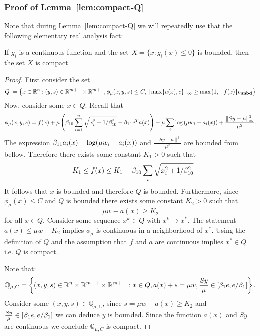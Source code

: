 \documentclass{article}
\begin{document}
\subsubsection{Proof of Lemma~\ref{lem:compact-Q}} \label{sec:lem:compact-Q}

Note that during Lemma~\ref{lem:compact-Q} we will repeatedly use that the following elementary real analysis fact: 

\begin{fact}
If $g_i$ is a continuous function and the set $X = \{ x : g_i(x) \le 0 \}$ is bounded, then the set $X$ is compact
\end{fact}

\lemCompactQ*

\begin{proof}
First consider the set
$$
Q := \left\{ x \in \mathbb{R}^{n} : (y, s) \in \mathbb{R}^{m++} \times \mathbb{R}^{m++}, \phi_{\mu}(x,y,s) \le C, \| \max\{ a(x), e \} \|_{\infty} \ge \max\{1,-f(x) \} \epsilon_{\textbf{unbd}} \right\} 
$$
Now, consider some $x \in Q$. Recall that
$$
\phi_{\mu}(x, y, s) = f(x) + \mu \left( \beta_{10} \sum_{i = 1}^{n} \sqrt{x_i^2 + 1 / \beta_{10}^2} - \beta_{11} e^T a(x) \right)  - \mu  \sum_i{ \log \left( \mu w_i - a_i(x)  \right) } + \frac{\| S y - \mu \|_{\infty}^3}{\mu^2}.
$$
The expression $\beta_{11} a_i(x) - \log(\mu w_i - a_i(x))$ and $\frac{\| S y - \mu \|^3}{\mu^2}$ are bounded from bellow. Therefore there exists some constant $K_{1} > 0$ such that
$$
-K_{1} \le f(x) \le K_{1} - \beta_{10} \sum_{i}{\sqrt{x_i^2 + 1 / \beta_{10}^2}}
$$
It follows that $x$ is bounded and therefore $Q$ is bounded. Furthermore, since $\phi_{\mu}(x) \le C$ and $Q$ is bounded there exists some constant $K_{2} > 0$ such that
$$
\mu w - a(x) \ge K_{2}
$$
for all $x \in Q$. Consider some sequence $x^{k} \in Q$ with $x^{k} \rightarrow x^{*}$. The statement $a(x) \le \mu w - K_{2}$ implies $\phi_{\mu}$ is continuous in a neighborhood of $x^{*}$. Using the definition of $Q$ and the assumption that $f$ and $a$ are continuous implies $x^{*} \in Q$ i.e. $Q$ is compact. 


Note that:
$$
\mathbb{Q}_{\mu, C} = \left\{ (x,y,s) \in \mathbb{R}^{n} \times \mathbb{R}^{m++} \times \mathbb{R}^{m++} : x \in Q, a(x) + s = \mu w, \frac{S y}{\mu} \in [\beta_{1} e, e / \beta_{1}]\right\}.
$$
Consider some $(x,y,s) \in \mathbb{Q}_{\mu, C}$, since $s = \mu w - a(x) \ge K_{2}$ and $\frac{S y}{\mu} \in [\beta_{1} e, e / \beta_{1}]$ we can deduce $y$ is bounded. Since the function $a(x)$ and $S y$ are continuous we conclude $\mathbb{Q}_{\mu, C}$ is compact.
\end{proof}
\end{document}
